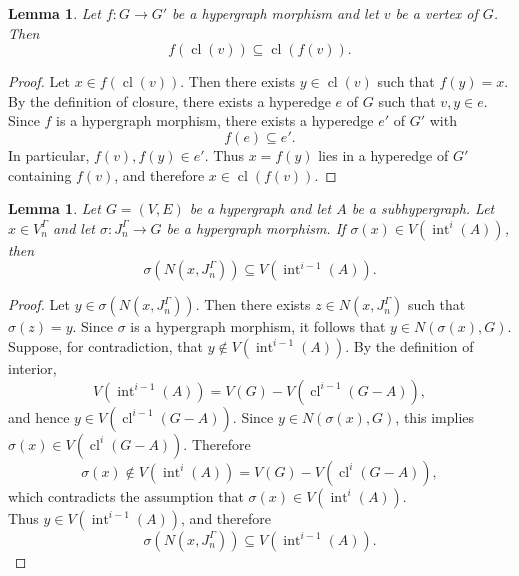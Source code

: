 \documentclass[10pt,a4paper]{amsart}
\newtheorem{lem}[subsection]{Lemma}
\newcommand{\cl}{\operatorname{cl}}
\renewcommand{\int}{\operatorname{int}}
\begin{document}
\begin{lem}\label{cl of vertex}
Let $f: G\to G'$ be a hypergraph morphism and let $v$ be a vertex of $G$.
Then
\[
f(\cl(v))\subseteq \cl(f(v)).
\]
\end{lem}
%
\begin{proof}
Let $x\in f(\cl(v))$. Then there exists $y\in \cl(v)$ such that
$f(y)=x$.\\
%
By the definition of closure, there exists a hyperedge $e$ of $G$
such that $v,y\in e$.
Since $f$ is a hypergraph morphism, there exists a hyperedge
$e'$ of $G'$ with
\[
f(e)\subseteq e'.
\]
In particular, $f(v),f(y)\in e'$.
Thus $x=f(y)$ lies in a hyperedge of $G'$ containing $f(v)$,
and therefore $x\in \cl(f(v))$.
\end{proof}

\begin{lem}\label{gamma interior}
Let $G=(V,E)$ be a hypergraph and let $A$ be a subhypergraph. Let $x\in V_n^\Gamma$ and let
$\sigma:J_n^\Gamma\to G$ be a hypergraph morphism. If
$\sigma(x)\in V(\int^{i}(A))$, then
\[
\sigma(N(x,J_n^\Gamma))\subseteq V(\int^{i-1}(A)).
\]
\end{lem}

\begin{proof}
Let $y\in \sigma(N(x,J_n^\Gamma))$. Then there exists
$z\in N(x,J_n^\Gamma)$ such that $\sigma(z)=y$.
Since $\sigma$ is a hypergraph morphism, it follows that
$y\in N(\sigma(x),G)$.\\
%
Suppose, for contradiction, that $y\notin V(\int^{i-1}(A))$.
By the definition of interior,
\[
V(\int^{i-1}(A))=V(G)- V(\cl^{i-1}(G-A)),
\]
and hence $y\in V(\cl^{i-1}(G-A))$.
Since $y\in N(\sigma(x),G)$, this implies
$\sigma(x)\in V(\cl^{i}(G-A))$.
Therefore
\[
\sigma(x)\notin V(\int^{i}(A))
= V(G)- V(\cl^{i}(G-A)),
\]
which contradicts the assumption that
$\sigma(x)\in V(\int^{i}(A))$.\\
%
Thus $y\in V(\int^{i-1}(A))$, and therefore
\[
\sigma(N(x,J_n^\Gamma))\subseteq V(\int^{i-1}(A)).
\]
\end{proof}
\end{document}
